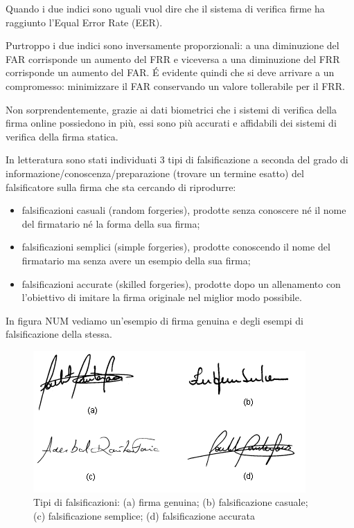 Quando i due indici sono uguali vuol dire che il sistema di verifica firme ha raggiunto l'Equal Error Rate (EER).

Purtroppo i due indici sono inversamente proporzionali: a una diminuzione del FAR corrisponde un aumento del FRR e viceversa a una diminuzione del FRR corrisponde un aumento del FAR. \'{E} evidente quindi che si deve arrivare a un compromesso: minimizzare il FAR conservando un valore tollerabile per il FRR.

Non sorprendentemente, grazie ai dati biometrici che i sistemi di verifica della firma online possiedono in più, essi sono più accurati e affidabili dei sistemi di verifica della firma statica.


In letteratura sono stati individuati 3 tipi di falsificazione a seconda del grado di informazione/conoscenza/preparazione (trovare un termine esatto) del falsificatore sulla firma che sta cercando di riprodurre:
\begin{itemize}
\item falsificazioni casuali (random forgeries), prodotte senza conoscere né il nome del firmatario né la forma della sua firma;
\item falsificazioni semplici (simple forgeries), prodotte conoscendo il nome del firmatario ma senza avere un esempio della sua firma;
\item falsificazioni accurate (skilled forgeries), prodotte dopo un allenamento con l'obiettivo di imitare la firma originale nel miglior modo possibile.
\end{itemize}
In figura NUM vediamo un'esempio di firma genuina e degli esempi di falsificazione della stessa.
\begin{figure}[h!]
\centering
\includegraphics[scale=1.0]{../Logo&Header/esempiForged.png}
\caption{Tipi di falsificazioni: (a) firma genuina; (b) falsificazione casuale;\\ (c) falsificazione semplice; (d) falsificazione accurata}
\end{figure}


